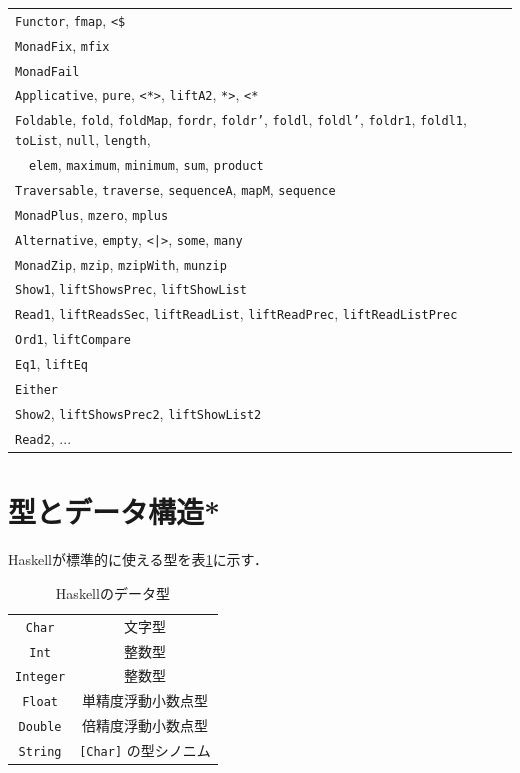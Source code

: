 \documentclass[a4paper,twocolumn]{jsbook}
\newcommand{\programminglanguage}[1]{\textsf{#1}}
\newcommand{\haskell}{\programminglanguage{Haskell}}
\newcommand{\code}[1]{\texttt{#1}}
\begin{document}
\begin{table}
\begin{center}
\begin{tabular}{||l||}
\code{Functor}, \code{fmap}, \code{<\$}\\
\code{MonadFix}, \code{mfix}\\
\code{MonadFail}\\
\code{Applicative}, \code{pure}, \code{<*>}, \code{liftA2}, \code{*>},  \code{<*}\\
\code{Foldable}, \code{fold}, \code{foldMap}, \code{fordr}, \code{foldr'}, \code{foldl}, \code{foldl'}, \code{foldr1}, \code{foldl1}, \code{toList}, \code{null}, \code{length},\\
~~\code{elem}, \code{maximum}, \code{minimum}, \code{sum}, \code{product}\\
\code{Traversable}, \code{traverse}, \code{sequenceA}, \code{mapM}, \code{sequence}\\
\code{MonadPlus}, \code{mzero}, \code{mplus}\\
\code{Alternative}, \code{empty}, \code{<|>}, \code{some}, \code{many}\\
\code{MonadZip}, \code{mzip}, \code{mzipWith}, \code{munzip}\\
\code{Show1}, \code{liftShowsPrec}, \code{liftShowList}\\
\code{Read1}, \code{liftReadsSec}, \code{liftReadList}, \code{liftReadPrec}, \code{liftReadListPrec}\\
\code{Ord1}, \code{liftCompare}\\
\code{Eq1}, \code{liftEq}\\
\code{Either}\\
\code{Show2}, \code{liftShowsPrec2}, \code{liftShowList2}\\
\code{Read2}, ...\\
\hline
\end{tabular}

\end{center}

\end{table}


\section{型とデータ構造*}

\haskell が標準的に使える型を表\ref{tab:data-types}に示す．

\begin{table}
\caption{\haskell のデータ型}
\label{tab:data-types}
\begin{center}
\begin{tabular}{||c|c||}
\hline
\code{Char}&文字型\\
\code{Int}&整数型\\
\code{Integer}&整数型\\
\code{Float}&単精度浮動小数点型\\
\code{Double}&倍精度浮動小数点型\\
\code{String}&\code{[Char]} の型シノニム\\
\hline
\end{tabular}
\end{center}
\end{table}
\end{document}

